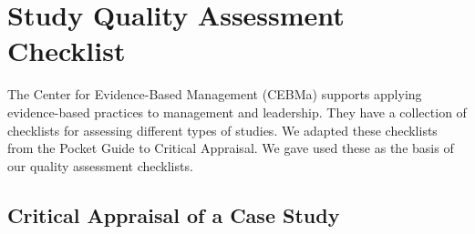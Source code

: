 
\chapter{Study Quality Assessment Checklist} 
\label{appendix:QualityAssesmentChecklist} 

The Center for Evidence-Based Management (CEBMa) supports applying evidence-based practices to management and leadership.
They have a collection of checklists for assessing different types of studies.
We adapted these checklists from the Pocket Guide to Critical Appraisal\cite{crombie1997pocket}.
We gave used these as the basis of our quality assessment checklists.

\section*{Critical Appraisal of a Case Study}

